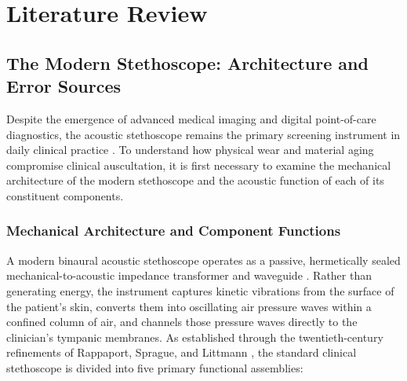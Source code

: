 \chapter{Literature Review}


\section{The Modern Stethoscope: Architecture and Error Sources}

Despite the emergence of advanced medical imaging and digital point-of-care diagnostics, the acoustic stethoscope remains the primary screening instrument in daily clinical practice \cite{leng2015electronic, fan2022real}. To understand how physical wear and material aging compromise clinical auscultation, it is first necessary to examine the mechanical architecture of the modern stethoscope and the acoustic function of each of its constituent components.

\subsection{Mechanical Architecture and Component Functions}

A modern binaural acoustic stethoscope operates as a passive, hermetically sealed mechanical-to-acoustic impedance transformer and waveguide \cite{ertel1966stethoscope, leng2015electronic}. Rather than generating energy, the instrument captures kinetic vibrations from the surface of the patient's skin, converts them into oscillating air pressure waves within a confined column of air, and channels those pressure waves directly to the clinician's tympanic membranes. As established through the twentieth-century refinements of Rappaport, Sprague, and Littmann \cite{weinberg1993color}, the standard clinical stethoscope is divided into five primary functional assemblies:

